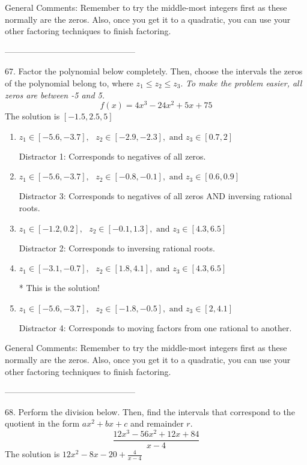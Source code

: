 \documentclass{extbook}[14pt]
\begin{document}
General Comments: Remember to try the middle-most integers first as these normally are the zeros. Also, once you get it to a quadratic, you can use your other factoring techniques to finish factoring.

-----------------------------------------------

67. Factor the polynomial below completely. Then, choose the intervals the zeros of the polynomial belong to, where $z_1 \leq z_2 \leq z_3$. \textit{To make the problem easier, all zeros are between -5 and 5.}
\[ f(x) = 4x^{3} -24 x^{2} +5 x + 75 \] 
The solution is $ [-1.5, 2.5, 5] $ 

\begin{enumerate}[label=\Alph*.] 
\item $ z_1 \in [-5.6, -3.7], \text{   }  z_2 \in [-2.9, -2.3], \text{   and   } z_3 \in [0.7, 2] $ 

  Distractor 1: Corresponds to negatives of all zeros. 
\item $ z_1 \in [-5.6, -3.7], \text{   }  z_2 \in [-0.8, -0.1], \text{   and   } z_3 \in [0.6, 0.9] $ 

  Distractor 3: Corresponds to negatives of all zeros AND inversing rational roots. 
\item $ z_1 \in [-1.2, 0.2], \text{   }  z_2 \in [-0.1, 1.3], \text{   and   } z_3 \in [4.3, 6.5] $ 

  Distractor 2: Corresponds to inversing rational roots. 
\item $ z_1 \in [-3.1, -0.7], \text{   }  z_2 \in [1.8, 4.1], \text{   and   } z_3 \in [4.3, 6.5] $ 

 * This is the solution! 
\item $ z_1 \in [-5.6, -3.7], \text{   }  z_2 \in [-1.8, -0.5], \text{   and   } z_3 \in [2, 4.1] $ 

  Distractor 4: Corresponds to moving factors from one rational to another. 
\end{enumerate} 
 
General Comments: Remember to try the middle-most integers first as these normally are the zeros. Also, once you get it to a quadratic, you can use your other factoring techniques to finish factoring.

-----------------------------------------------

68. Perform the division below. Then, find the intervals that correspond to the quotient in the form $ax^2+bx+c$ and remainder $r$.
\[ \frac{12x^{3} -56 x^{2} +12 x + 84}{x -4} \] 
The solution is $ 12x^{2} -8 x -20 + \frac{4}{x -4} $ 
\end{document}
